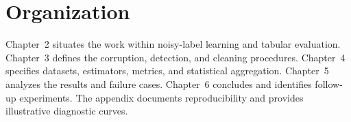 \section{Organization}
Chapter~2 situates the work within noisy-label learning and tabular evaluation.
Chapter~3 defines the corruption, detection, and cleaning procedures.
Chapter~4 specifies datasets, estimators, metrics, and statistical aggregation.
Chapter~5 analyzes the results and failure cases. Chapter~6 concludes and
identifies follow-up experiments. The appendix documents reproducibility and
provides illustrative diagnostic curves.
